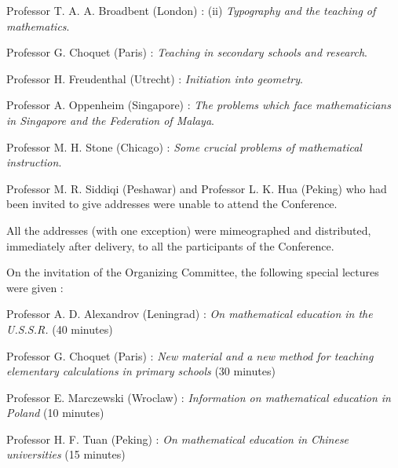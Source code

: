 Professor T. A. A. Broadbent (London) : (ii) {\em Typography and the teaching of mathematics}.

Professor G. Choquet (Paris) : {\em Teaching in secondary schools and research}.

Professor H. Freudenthal (Utrecht) : {\em Initiation into geometry}.

Professor A. Oppenheim (Singapore) : {\em The problems which face mathematicians in Singapore and the Federation of Malaya}.

Professor M. H. Stone (Chicago) : {\em Some crucial problems of mathematical instruction}.

Professor M. R. Siddiqi (Peshawar) and Professor L. K. Hua (Peking) who had been invited to give addresses were unable to attend the Conference.

All the addresses (with one exception) were mimeographed and distributed, immediately after delivery, to all the participants of the Conference.

On the invitation of the Organizing Committee, the following special lectures were given :

Professor A. D. Alexandrov (Leningrad) : {\em On mathematical education in the U.S.S.R.} (40 minutes)

Professor G. Choquet (Paris) : {\em New material and a new method for teaching elementary calculations in primary schools} (30 minutes)

Professor E. Marczewski (Wroclaw) : {\em Information on mathematical education in Poland} (10 minutes)

Professor H. F. Tuan (Peking) : {\em On mathematical education in Chinese universities} (15 minutes)

